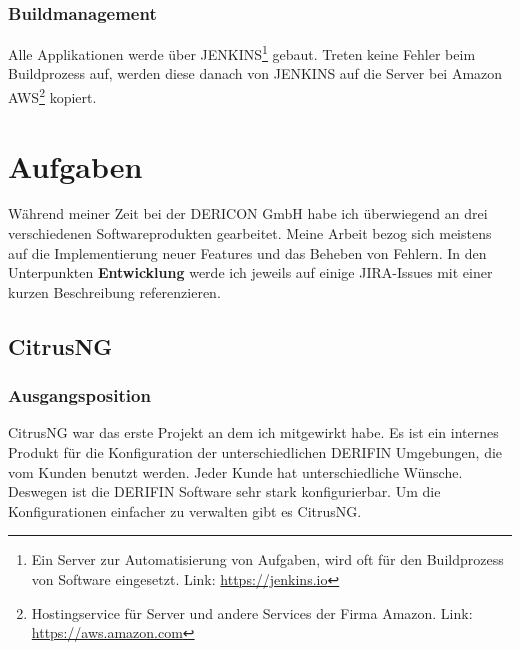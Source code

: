 \documentclass[chapterprefix=false, 12pt, a4paper, oneside, parskip=half, listof=totoc, bibliography=totoc, numbers=noendperiod]{scrbook}
\begin{document}
    \subsection{Buildmanagement}

    Alle Applikationen werde über JENKINS\footnote{Ein Server zur Automatisierung von Aufgaben, wird oft für den Buildprozess von Software eingesetzt. Link: \url{https://jenkins.io}} gebaut.
    Treten keine Fehler beim Buildprozess auf, werden diese danach von JENKINS auf die Server bei Amazon AWS\footnote{Hostingservice für Server und andere Services der Firma Amazon. Link: \url{https://aws.amazon.com}} kopiert.

    \chapter{Aufgaben}

    Während meiner Zeit bei der DERICON GmbH habe ich überwiegend an drei verschiedenen Softwareprodukten gearbeitet.
    Meine Arbeit bezog sich meistens auf die Implementierung neuer Features und das Beheben von Fehlern. In den Unterpunkten \textbf{Entwicklung}
    werde ich jeweils auf einige JIRA-Issues mit einer kurzen Beschreibung referenzieren.

    \section{CitrusNG}

    \subsection{Ausgangsposition}

    CitrusNG war das erste Projekt an dem ich mitgewirkt habe. Es ist ein internes Produkt für die Konfiguration der unterschiedlichen DERIFIN Umgebungen, die
    vom Kunden benutzt werden. Jeder Kunde hat unterschiedliche Wünsche. Deswegen ist die DERIFIN Software sehr stark konfigurierbar.
    Um die Konfigurationen einfacher zu verwalten gibt es CitrusNG.
\end{document}
